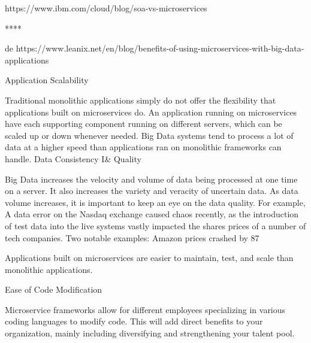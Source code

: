 https://www.ibm.com/cloud/blog/soa-vs-microservices


****

de https://www.leanix.net/en/blog/benefits-of-using-microservices-with-big-data-applications

Application Scalability

Traditional monolithic applications simply do not offer the flexibility that applications built on microservices do. An application running on microservices have each supporting component running on different servers, which can be scaled up or down whenever needed. Big Data systems tend to process a lot of data at a higher speed than applications ran on monolithic frameworks can handle.
Data Consistency I\& Quality

Big Data increases the velocity and volume of data being processed at one time on a server. It also increases the variety and veracity of uncertain data. As data volume increases, it is important to keep an eye on the data quality. For example, A data error on the Nasdaq exchange caused chaos recently, as the introduction of test data into the live systems vastly impacted the shares prices of a number of tech companies. Two notable examples: Amazon prices crashed by 87%

Applications built on microservices are easier to maintain, test, and scale than monolithic applications.

Ease of Code Modification

Microservice frameworks allow for different employees specializing in various coding languages to modify code. This will add direct benefits to your organization, mainly including diversifying and strengthening your talent pool.

